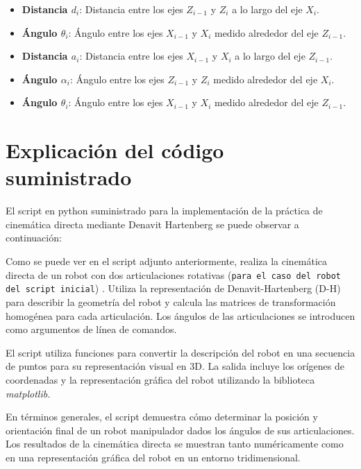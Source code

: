 \documentclass[11pt]{report}
\begin{document}
\begin{itemize}
    \item \textbf{Distancia $d_i$}: Distancia entre los ejes $Z_{i-1}$ y $Z_i$ a lo largo del eje $X_i$.
    \item \textbf{Ángulo $\theta_i$}: Ángulo entre los ejes $X_{i-1}$ y $X_i$ medido alrededor del eje $Z_{i-1}$.
    \item \textbf{Distancia $a_i$}: Distancia entre los ejes $X_{i-1}$ y $X_i$ a lo largo del eje $Z_{i-1}$.
    \item \textbf{Ángulo $\alpha_i$}: Ángulo entre los ejes $Z_{i-1}$ y $Z_i$ medido alrededor del eje $X_i$.
    \item \textbf{Ángulo $\theta_i$}: Ángulo entre los ejes $X_{i-1}$ y $X_i$ medido alrededor del eje $Z_{i-1}$.
\end{itemize}

\section{Explicación del código suministrado}

El script en python suministrado para la implementación de la práctica de cinemática directa mediante Denavit Hartenberg se puede observar a continuación: 



Como se puede ver en el script adjunto anteriormente, realiza la cinemática directa de un robot con dos articulaciones rotativas (\texttt{para el caso del robot del script inicial}) . Utiliza la representación de Denavit-Hartenberg (D-H) para describir la geometría del robot y calcula las matrices de transformación homogénea para cada articulación. Los ángulos de las articulaciones se introducen como argumentos de línea de comandos.

El script utiliza funciones para convertir la descripción del robot en una secuencia de puntos para su representación visual en 3D. La salida incluye los orígenes de coordenadas y la representación gráfica del robot utilizando la biblioteca \emph{matplotlib}.

En términos generales, el script demuestra cómo determinar la posición y orientación final de un robot manipulador dados los ángulos de sus articulaciones. Los resultados de la cinemática directa se muestran tanto numéricamente como en una representación gráfica del robot en un entorno tridimensional.
\end{document}
